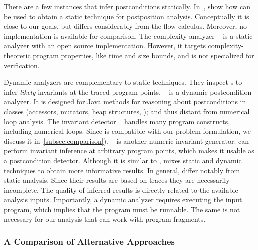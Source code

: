 There are a few instances that infer postconditions statically.
In~\cite{popeea2006}, show how  can be used to obtain a static technique for postposition analysis.
Conceptually it is close to our goals, but  differs considerably from the flow calculus.
Moreover, no implementation is available for comparison.
The complexity analyzer ~\cite{giesl2022} is a static analyzer with an open source implementation.
However, it targets complexity-theoretic program properties, like time and size bounds, and is not specialized for verification.

Dynamic analyzers are complementary to static techniques.
They inspect s to infer \emph{likely} invariants at the traced program points.
~\cite{molina2021} is a dynamic postcondition analyzer.
It is designed for Java methods for reasoning about postconditions in classes (accessors, mutators, heap structures, \etc);
and thus distant from numerical loop analysis.
The invariant detector ~\cite{ernst2007} handles many program constructs, including numerical loops.
Since  is compatible with our problem formulation, we discuss it in~\autoref{subsec:comparison}).
~\cite{nguyen2014} is another numeric invariant generator.
 can perform invariant inference at arbitrary program points, which makes it usable as a postcondition detector.
Although it is similar to ,  mixes static and dynamic techniques to obtain more informative results.
In general,  differ notably from static analysis.
Since their results are based on traces they are necessarily incomplete.
The quality of inferred results is directly related to the available analysis inputs.
Importantly, a dynamic analyzer requires executing the input program, which implies that the program must be runnable.
The same is not necessary for our analysis that can work with program fragments.

\subsubsection{A Comparison of Alternative Approaches}
\label{subsec:comparison}

